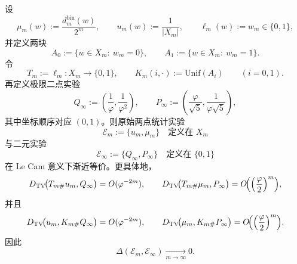 \begin{theorem}\label{thm:xi-time-part69-binfold-lecam-two-point-collapse}
设
\[
\mu_m(w):=\frac{d_m^{\mathrm{bin}}(w)}{2^m},
\qquad
u_m(w):=\frac{1}{|X_m|},
\qquad
\ell_m(w):=w_m\in\{0,1\},
\]
并定义两块
\[
A_0:=\{w\in X_m:\ w_m=0\},
\qquad
A_1:=\{w\in X_m:\ w_m=1\}.
\]
令
\[
T_m:=\ell_m:X_m\to\{0,1\},
\qquad
K_m(i,\cdot):=\mathrm{Unif}(A_i)\qquad(i=0,1).
\]
再定义极限二点实验
\[
Q_\infty:=\left(\frac1\varphi,\frac1{\varphi^2}\right),
\qquad
P_\infty:=\left(\frac{\varphi}{\sqrt5},\frac{1}{\varphi\sqrt5}\right),
\]
其中坐标顺序对应 \((0,1)\)。则原始两点统计实验
\[
\mathcal E_m:=\{u_m,\mu_m\}\quad\text{定义在 }X_m
\]
与二元实验
\[
\mathcal E_\infty:=\{Q_\infty,P_\infty\}\quad\text{定义在 }\{0,1\}
\]
在 Le Cam 意义下渐近等价。更具体地，
\[
D_{\mathrm{TV}}\!\bigl(T_{m\#}u_m,Q_\infty\bigr)=O(\varphi^{-2m}),
\qquad
D_{\mathrm{TV}}\!\bigl(T_{m\#}\mu_m,P_\infty\bigr)=O\!\Bigl(\Bigl(\frac{\varphi}{2}\Bigr)^m\Bigr),
\]
并且
\[
D_{\mathrm{TV}}\!\bigl(u_m,K_{m\#}Q_\infty\bigr)=O(\varphi^{-2m}),
\qquad
D_{\mathrm{TV}}\!\bigl(\mu_m,K_{m\#}P_\infty\bigr)=O\!\Bigl(\Bigl(\frac{\varphi}{2}\Bigr)^m\Bigr).
\]
因此
\[
\Delta(\mathcal E_m,\mathcal E_\infty)\xrightarrow[m\to\infty]{}0.
\]
\end{theorem}
